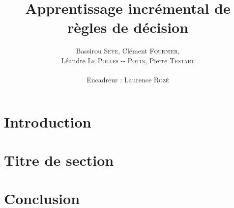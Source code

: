 \documentclass[a4paper,11pt]{article}
\title{ \textbf{Apprentissage incrémental de règles de décision} }
\author{Bassirou \textsc{Seye}, Clément \textsc{Fournier}, \\
        Léandre \textsc{Le Polles -{}- Potin}, Pierre \textsc{Testart} \\
        \\
        Encadreur : Laurence \textsc{Rozé}}
\date{}                    %
\begin{document}
          

\maketitle                 %
\thispagestyle{empty}      %



\begin{abstract}
\lipsum[1]
\end{abstract} 


\section{Introduction}  
    \lipsum[2]

\section{Titre de section}  

\lipsum[2]\cite{Gama-VFDR}
\section{Conclusion} 
 
\lipsum[2]


\end{document}
